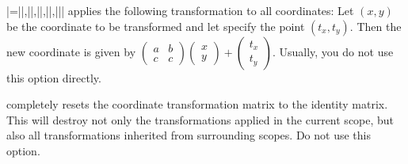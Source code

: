 \begin{itemize}
  |={||,||,||,||,||}|
  applies the following transformation to all coordinates: Let $(x,y)$
  be the coordinate to be transformed and let 
  specify the point $(t_x,t_y)$. Then the new coordinate is given by
  $\left(\begin{smallmatrix} a & b \\ c & c\end{smallmatrix}\right)
  \left(\begin{smallmatrix} x \\ y \end{smallmatrix}\right) +
  \left(\begin{smallmatrix} t_x \\ t_y
  \end{smallmatrix}\right)$. Usually, you do not use this option
  directly. 
\begin{codeexample}[]
\end{codeexample}

  completely resets the coordinate transformation matrix to the
  identity matrix. This will destroy not only the transformations
  applied in the current scope, but also all transformations inherited
  from surrounding scopes. Do not use this option.
\end{itemize}


